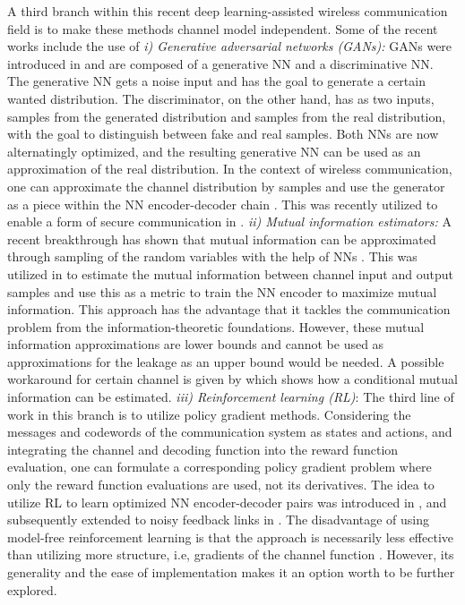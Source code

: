 \documentclass[conference, 10pt]{IEEEtran}
\begin{document}
A third branch within this recent deep learning-assisted wireless communication field is to make these methods channel model independent. Some of the recent works include the use of 
\emph{i) Generative adversarial networks (GANs):} GANs were introduced in \cite{goodfellow2014generative} and are composed of a generative NN and a discriminative NN. The generative NN gets a noise input and has the goal to generate a certain wanted distribution. The discriminator, on the other hand, has as two inputs, samples from the generated distribution and samples from the real distribution, with the goal to distinguish between fake and real samples. Both NNs are now alternatingly optimized, and the resulting generative NN can be used as an approximation of the real distribution. In the context of wireless communication, one can approximate the channel distribution by samples and use the generator as a piece within the NN encoder-decoder chain \cite{Cond_GAN_AE,oShea2018GAN}.  This was recently utilized to enable a form of secure communication in \cite{Gunduz_GAN_sec}.
\emph{ii) Mutual information estimators:} A recent breakthrough has shown that mutual information can be approximated through sampling of the random variables with the help of NNs \cite{belghazi2018mine}. This was utilized in \cite{Fritschek_SPAWC19} to estimate the mutual information between channel input and output samples and use this as a metric to train the NN encoder to maximize mutual information. This approach has the advantage that it tackles the communication problem from the information-theoretic foundations. However, these mutual information approximations are lower bounds and cannot be used as approximations for the leakage as an upper bound would be needed. A possible workaround for certain channel is given by \cite{molavipour2020conditional} which shows how a conditional mutual information can be estimated. 
\emph{iii) Reinforcement learning (RL)}: The third line of work in this branch is to utilize policy gradient methods. Considering the messages and codewords of the communication system as states and actions, and integrating the channel and decoding function into the reward function evaluation, one can formulate a corresponding policy gradient problem where only the reward function evaluations are used, not its derivatives. The idea to utilize RL to learn optimized NN encoder-decoder pairs was introduced in \cite{Aoudia-RL}, and subsequently extended to noisy feedback links in \cite{goutay2018deep}. The disadvantage of using model-free reinforcement learning is that the approach is necessarily less effective than utilizing more structure, i.e, gradients of the channel function \cite{recht2019tour}. However, its generality and the ease of implementation makes it an option worth to be further explored.
\end{document}
